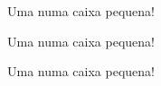 \documentclass[a4paper,12pt]{article}
\begin{document}
		
	\Huge
		
	Uma  numa caixa pequena!\par
	Uma  numa caixa pequena!\par
	Uma  numa caixa pequena!
		
\end{document}
